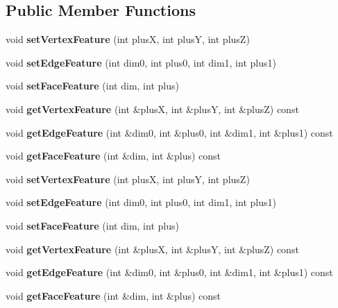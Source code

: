 \subsection*{Public Member Functions}
\begin{DoxyCompactItemize}
\item 
\mbox{\label{classBoxPoint_a98fe8f354c6cb170691007c0b8722761}} 
void {\bfseries set\+Vertex\+Feature} (int plusX, int plusY, int plusZ)
\item 
\mbox{\label{classBoxPoint_a2cec737b3f0272457ee8230cf9319d4b}} 
void {\bfseries set\+Edge\+Feature} (int dim0, int plus0, int dim1, int plus1)
\item 
\mbox{\label{classBoxPoint_a836df69f314b2b51c2186cff9f151ea9}} 
void {\bfseries set\+Face\+Feature} (int dim, int plus)
\item 
\mbox{\label{classBoxPoint_ac57aadaf589369ffeeb64fe755f3dd60}} 
void {\bfseries get\+Vertex\+Feature} (int \&plusX, int \&plusY, int \&plusZ) const
\item 
\mbox{\label{classBoxPoint_aa00b273773b1d03c6d1a64779a09749b}} 
void {\bfseries get\+Edge\+Feature} (int \&dim0, int \&plus0, int \&dim1, int \&plus1) const
\item 
\mbox{\label{classBoxPoint_a3b87a91c723fd5f2f0a881802277a339}} 
void {\bfseries get\+Face\+Feature} (int \&dim, int \&plus) const
\item 
\mbox{\label{classBoxPoint_a98fe8f354c6cb170691007c0b8722761}} 
void {\bfseries set\+Vertex\+Feature} (int plusX, int plusY, int plusZ)
\item 
\mbox{\label{classBoxPoint_a2cec737b3f0272457ee8230cf9319d4b}} 
void {\bfseries set\+Edge\+Feature} (int dim0, int plus0, int dim1, int plus1)
\item 
\mbox{\label{classBoxPoint_a836df69f314b2b51c2186cff9f151ea9}} 
void {\bfseries set\+Face\+Feature} (int dim, int plus)
\item 
\mbox{\label{classBoxPoint_ac57aadaf589369ffeeb64fe755f3dd60}} 
void {\bfseries get\+Vertex\+Feature} (int \&plusX, int \&plusY, int \&plusZ) const
\item 
\mbox{\label{classBoxPoint_aa00b273773b1d03c6d1a64779a09749b}} 
void {\bfseries get\+Edge\+Feature} (int \&dim0, int \&plus0, int \&dim1, int \&plus1) const
\item 
\mbox{\label{classBoxPoint_a3b87a91c723fd5f2f0a881802277a339}} 
void {\bfseries get\+Face\+Feature} (int \&dim, int \&plus) const
\end{DoxyCompactItemize}
